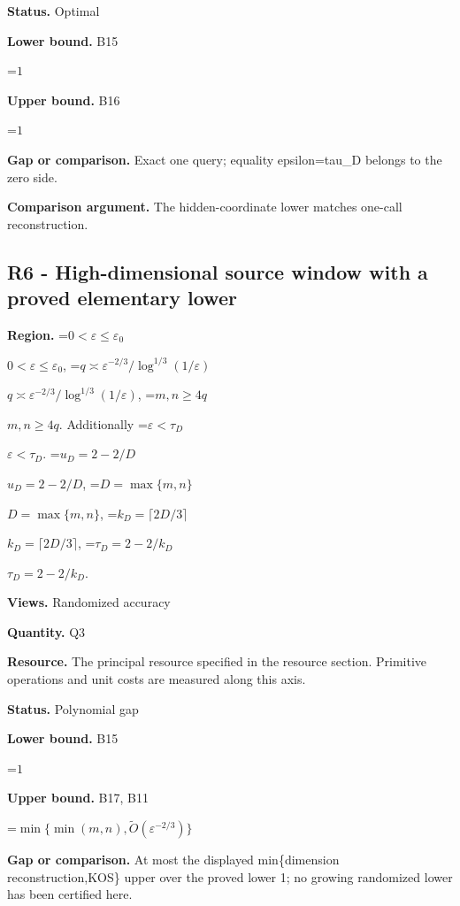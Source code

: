 \documentclass[10pt,a4paper]{article}
\newcommand{\AtlasMath}[1]{\par\begingroup\centering\setbox0=\hbox{$\displaystyle #1$}\ifdim\wd0>1.4\linewidth\typeout{ATLAS WIDE FORMULA: \the\wd0}\fi\ifdim\wd0>\linewidth\resizebox{\linewidth}{!}{\box0}\else\box0\fi\par\endgroup}
\newcommand{\AtlasInlineMath}[1]{\begingroup\setbox0=\hbox{$#1$}\ifdim\wd0>.4\linewidth\endgroup\AtlasMath{#1}\else\endgroup$#1$\fi}
\begin{document}
\textbf{Status.} Optimal



\textbf{Lower bound.} B15



\AtlasMath{1}


\textbf{Upper bound.} B16



\AtlasMath{1}


\textbf{Gap or comparison.} Exact one query; equality epsilon=tau\_D belongs to the zero side.



\textbf{Comparison argument.} The hidden-coordinate lower matches one-call reconstruction.



\subsection{R6 - High-dimensional source window with a proved elementary lower}


\textbf{Region.} \AtlasInlineMath{0<\varepsilon\le\varepsilon_0}, \AtlasInlineMath{q\asymp\varepsilon^{-2/3}/\log^{1/3}(1/\varepsilon)}, \AtlasInlineMath{m,n\ge4q}. Additionally \AtlasInlineMath{\varepsilon<\tau_D}. \AtlasInlineMath{u_D=2-2/D}, \AtlasInlineMath{D=\max\{m,n\}}, \AtlasInlineMath{k_D=\lceil2D/3\rceil}, \AtlasInlineMath{\tau_D=2-2/k_D}.



\textbf{Views.} Randomized accuracy



\textbf{Quantity.} Q3



\textbf{Resource.} The principal resource specified in the resource section. Primitive operations and unit costs are measured along this axis.



\textbf{Status.} Polynomial gap



\textbf{Lower bound.} B15



\AtlasMath{1}


\textbf{Upper bound.} B17, B11



\AtlasMath{\min\{\min(m,n),\widetilde O(\varepsilon^{-2/3})\}}


\textbf{Gap or comparison.} At most the displayed min\{dimension reconstruction,KOS\} upper over the proved lower 1; no growing randomized lower has been certified here.
\end{document}
